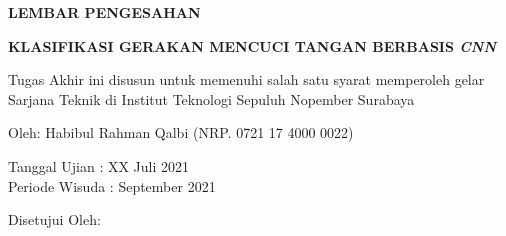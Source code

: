 \begin{center}
	\large
  \textbf{LEMBAR PENGESAHAN}
\end{center}

\thispagestyle{empty}

\begin{center}
  \textbf{KLASIFIKASI GERAKAN MENCUCI TANGAN BERBASIS \emph{CNN}}
\end{center}

\begingroup
  \small

  \begin{center}
    Tugas Akhir ini disusun untuk memenuhi salah satu syarat memperoleh gelar Sarjana Teknik di Institut Teknologi Sepuluh Nopember Surabaya
  \end{center}

  \begin{center}
    Oleh: Habibul Rahman Qalbi (NRP. 0721 17 4000 0022)
  \end{center}

  \begin{center}
    Tanggal Ujian : XX Juli 2021\\
    Periode Wisuda : September 2021
  \end{center}

  \begin{center}
    Disetujui Oleh:
  \end{center}

  \begingroup
    \setlength{\tabcolsep}{0pt}

